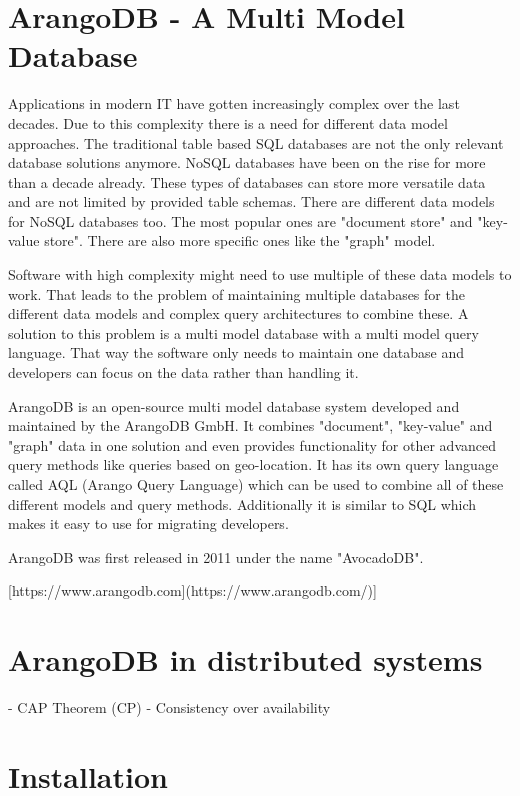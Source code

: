 
\section{ArangoDB - A Multi Model Database}
Applications in modern IT have gotten increasingly complex over the last decades. Due to this complexity there is a need for different data model approaches. The traditional table based SQL databases are not the only relevant database solutions anymore. NoSQL databases have been on the rise for more than a decade already. These types of databases can store more versatile data and are not limited by provided table schemas. There are different data models for NoSQL databases too. The most popular ones are "document store" and "key-value store". There are also more specific ones like the "graph" model.

Software with high complexity might need to use multiple of these data models to work. That leads to the problem of maintaining multiple databases for the different data models and complex query architectures to combine these. A solution to this problem is a multi model database with a multi model query language. That way the software only needs to maintain one database and developers can focus on the data rather than handling it.

ArangoDB is an open-source multi model database system developed and maintained by the ArangoDB GmbH. It combines "document", "key-value" and "graph" data in one solution and even provides functionality for other advanced query methods like queries based on geo-location. It has its own query language called AQL (Arango Query Language) which can be used to combine all of these different models and query methods. Additionally it is similar to SQL which makes it easy to use for migrating developers.

ArangoDB was first released in 2011 under the name "AvocadoDB". 

[https://www.arangodb.com](https://www.arangodb.com/)]

\section{ArangoDB in distributed systems}
- CAP Theorem (CP)
- Consistency over availability

\section{Installation}


